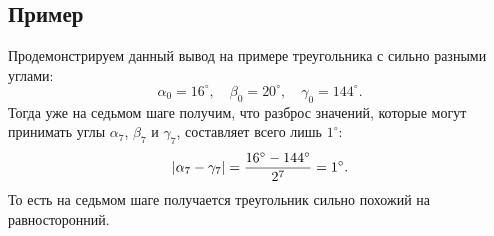 \documentclass[12pt]{article}
\begin{document}
\subsection{Пример}
Продемонстрируем данный вывод на примере треугольника с сильно разными углами:
\begin{equation}
	\alpha_{0} = 16^{\circ},\quad \beta_0 = 20^{\circ}, \quad \gamma_0 = 144^{\circ}.
\end{equation}
Тогда уже на седьмом шаге получим, что разброс значений, которые могут принимать углы $\alpha_7$, $\beta_7$ и $\gamma_7$, составляет всего лишь $1^{\circ}$:
\begin{equation}
	\abs{\alpha_{7} - \gamma_{7}} = \dfrac{16^{\circ} - 144^{\circ}}{2^7} = 1^{\circ}.
\end{equation}
То есть на седьмом шаге получается треугольник сильно похожий на равносторонний.
\end{document}
